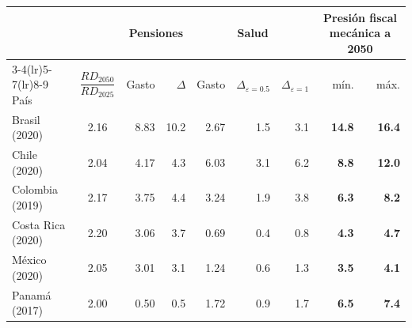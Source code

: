 \begin{tabular}{lcrrrrrrr}
\toprule
& & \multicolumn{2}{c}{Pensiones} & \multicolumn{3}{c}{Salud} & \multicolumn{2}{c}{Presión fiscal mecánica a 2050} \\
\cmidrule(lr){3-4}\cmidrule(lr){5-7}\cmidrule(lr){8-9}
País & $\dfrac{RD_{2050}}{RD_{2025}}$ & Gasto & $\Delta$ & Gasto & $\Delta_{\varepsilon=0.5}$ & $\Delta_{\varepsilon=1}$ & mín. & máx. \\
\midrule
Brasil (2020) & 2.16 & 8.83 & 10.2 & 2.67 & 1.5 & 3.1 & \textbf{14.8} & \textbf{16.4} \\
Chile (2020) & 2.04 & 4.17 & 4.3 & 6.03 & 3.1 & 6.2 & \textbf{8.8} & \textbf{12.0} \\
Colombia (2019) & 2.17 & 3.75 & 4.4 & 3.24 & 1.9 & 3.8 & \textbf{6.3} & \textbf{8.2} \\
Costa Rica (2020) & 2.20 & 3.06 & 3.7 & 0.69 & 0.4 & 0.8 & \textbf{4.3} & \textbf{4.7} \\
México (2020) & 2.05 & 3.01 & 3.1 & 1.24 & 0.6 & 1.3 & \textbf{3.5} & \textbf{4.1} \\
Panamá (2017) & 2.00 & 0.50 & 0.5 & 1.72 & 0.9 & 1.7 & \textbf{6.5} & \textbf{7.4} \\
\bottomrule
\end{tabular}
